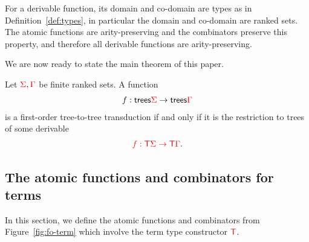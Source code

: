 For a derivable function, its domain and co-domain are types as in Definition~\ref{def:types}, in particular the domain and co-domain are ranked sets. The atomic functions are arity-preserving and the combinators preserve this property, and therefore all derivable functions are arity-preserving. 


We are now ready to state the main theorem of this paper. 

\begin{theorem}\label{thm:main}
    Let ${\color{red}{\Sigma}},{\color{red}{\Gamma}}$ be finite ranked sets. A function 
    \begin{align*}
        f : \mathsf {trees} {\color{red}{\Sigma}} \to \mathsf {trees} {\color{red}{\Gamma}}
    \end{align*}
    is a first-order tree-to-tree transduction if and only if it is the restriction to trees of some derivable
    \begin{align*}
        {\color{red}{f : {\color{red}{\mathsf T}}\Sigma \to {\color{red}{\mathsf T}}\Gamma}}.
    \end{align*}
    
\end{theorem}








\subsection{The atomic functions and combinators for terms}
\label{sec:atomic-and-combinators}
In this section, we define the atomic functions and combinators from Figure~\ref{fig:fo-term} which involve the term type constructor ${\color{red}{\mathsf T}}$. 



